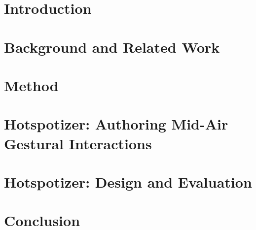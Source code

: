 \documentclass[10pt,twoside]{book}
\begin{document}
\tableofcontents



\chapter{Introduction}


\chapter{Background and Related Work}


\chapter{Method}


\chapter{Hotspotizer: Authoring Mid-Air Gestural Interactions}


\chapter{Hotspotizer: Design and Evaluation}


\chapter{Conclusion}


\printbibliography

\appendix

\end{document}
